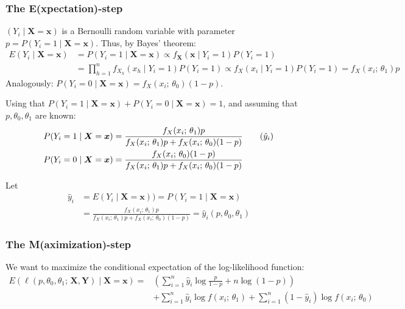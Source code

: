 \subsubsection{The E(xpectation)-step}
$(Y_i \mid \boldsymbol{X}=\boldsymbol{x})$ is a Bernoulli random variable with parameter
$p = P(Y_i = 1 \mid \boldsymbol{X}=\boldsymbol{x})$. Thus, by Bayes' theorem:
\begin{align*}
    E(Y_i \mid \boldsymbol{X}=\boldsymbol{x}) & = P(Y_i = 1 \mid \boldsymbol{X}=\boldsymbol{x})
    \propto f_{\boldsymbol{X}}(\boldsymbol{x} \mid Y_i = 1) P(Y_i = 1) \\
                                              &= \prod_{h=1}^n f_{X_h}(x_h \mid Y_i = 1) P(Y_i = 1)
                                              \propto f_X(x_i \mid Y_i = 1) P(Y_i = 1) = f_X(x_i;\,\theta_1) p
\end{align*}
Analogously: $P(Y_i = 0 \mid \boldsymbol{X}=\boldsymbol{x}) = f_X(x_i;\,\theta_0) (1-p)$.

Using that $P(Y_i = 1 \mid \boldsymbol{X}=\boldsymbol{x}) + P(Y_i = 0 \mid \boldsymbol{X}=\boldsymbol{x}) = 1$,
and assuming that $p, \theta_0, \theta_1$ are known:
\begin{align*}
    P(Y_i = 1 \mid \boldsymbol{X}=\boldsymbol{x}) & = \frac{f_X(x_i;\,\theta_1) p}{f_X(x_i;\,\theta_1) p + f_X(x_i;\,\theta_0) (1-p)} \tag{$\hat{y}_i$}\\
    P(Y_i = 0 \mid \boldsymbol{X}=\boldsymbol{x}) & = \frac{f_X(x_i;\,\theta_0) (1-p)}{f_X(x_i;\,\theta_1) p + f_X(x_i;\,\theta_0) (1-p)}
\end{align*}

Let
\begin{align*}
    \hat{y}_i & = E(Y_i \mid \boldsymbol{X}=\boldsymbol{x}) ) =
    P(Y_i = 1 \mid \boldsymbol{X}=\boldsymbol{x}) \\
              &= \frac{f_X(x_i;\,\theta_1) p}{f_X(x_i;\,\theta_1) p + f_X(x_i;\,\theta_0) (1-p)}
              = \hat{y}_i(p,\theta_0,\theta_1)
\end{align*}

\subsubsection{The M(aximization)-step}
We want to maximize the conditional expectation of the log-likelihood function:
\begin{align*}
    E \left(\ell(p,\theta_0,\theta_1;\,\boldsymbol{X},\boldsymbol{Y}) \mid \boldsymbol{X}=\boldsymbol{x} \right)
    = & \left(
        \sum_{i=1}^n \hat{y}_i \log \frac{p}{1-p} + n \log (1 - p)
        \right) \\
      & + \sum_{i=1}^n \hat{y}_i \log f(x_i;\,\theta_1) + \sum_{i=1}^n (1 - \hat{y}_i) \log f(x_i;\,\theta_0)
\end{align*}

